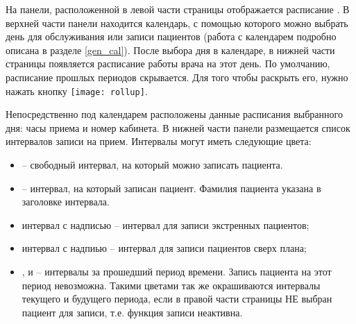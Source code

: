 {На панели, расположенной в левой части страницы отображается расписание    . В верхней части панели находится календарь, с помощью которого можно выбрать день для обслуживания или записи пациентов (работа с календарем подробно описана в разделе \ref{gen_cal}). После выбора дня в календаре, в нижней части страницы появляется расписание работы врача  на этот день. По умолчанию, расписание прошлых периодов скрывается. Для того чтобы раскрыть его, нужно нажать кнопку \texttt{[image: rollup]}.    

Непосредственно под календарем расположены данные расписания выбранного дня: часы приема и номер кабинета. В нижней части панели размещается список интервалов записи на прием. Интервалы могут иметь следующие цвета:
\begin{itemize}
	\item {} -- свободный интервал, на который можно записать пациента.
	\item {} -- интервал, на который записан пациент. Фамилия пациента указана в заголовке интервала.
	\item {} интервал с надписью  -- интервал для записи экстренных пациентов;
	\item {} интервал с надпиью  -- интервал для записи пациентов сверх плана;
	\item {},  и  -- интервалы за прошедший период времени. Запись пациента на этот период невозможна. Такими цветами так же окрашиваются интервалы текущего и будущего периода, если в правой части страницы НЕ выбран пациент для записи, т.е. функция записи неактивна.
\end{itemize}

}
